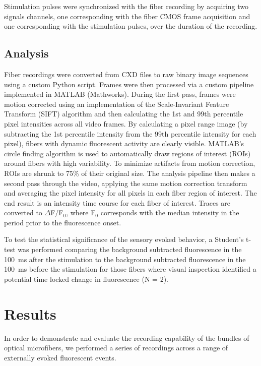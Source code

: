 Stimulation pulses were synchronized with the fiber recording by 
acquiring two signals channels, one corresponding with the fiber CMOS 
frame acquisition and one corresponding with the stimulation pulses, 
over the duration of the recording.

\subsection{Analysis}

Fiber recordings were converted from CXD files to raw binary image 
sequences using a custom Python script. Frames were then processed via
 a custom pipeline implemented in MATLAB (Mathworks). During the first
 pass, frames were motion corrected using an implementation of the 
Scale-Invariant Feature Transform (SIFT) algorithm 
\cite{vedaldi08vlfeat,lowe1999object,Lowe:2004kp} and then calculating
 the 1st and 99th percentile pixel intensities across all video frames.
By calculating a pixel range image (by subtracting 
the 1st percentile intensity from the 99th percentile intensity for each pixel), 
fibers with dynamic fluorescent activity are clearly visible. 
MATLAB's circle finding algorithm \cite{Atherton:1999dl} is used to 
automatically draw regions of interest (ROIs) around fibers with high 
variability. To minimize artifacts from motion correction, ROIs are 
shrunk to 75\% of their original size. The analysis pipeline then 
makes a second pass through the video, applying the same motion 
correction transform and averaging the pixel intensity for all pixels 
in each fiber region of interest. The end result is an intensity time 
course for each fiber of interest. Traces are converted to 
$\Delta$F/F$_0$, where F$_0$ corresponds with the median intensity in the 
period prior to the fluorescence onset.

To test the statistical significance of the sensory evoked behavior, a
 Student's t-test was performed comparing the background subtracted 
fluorescence in the 100~ms after the stimulation to the background 
subtracted fluorescence in the 100~ms before the stimulation for those
 fibers where visual inspection identified a potential time locked 
change in fluorescence (N = 2).

\section{Results}

In order to demonstrate and evaluate the recording capability of the 
bundles of optical microfibers, we performed a series of recordings 
across a range of externally evoked fluorescent events.

